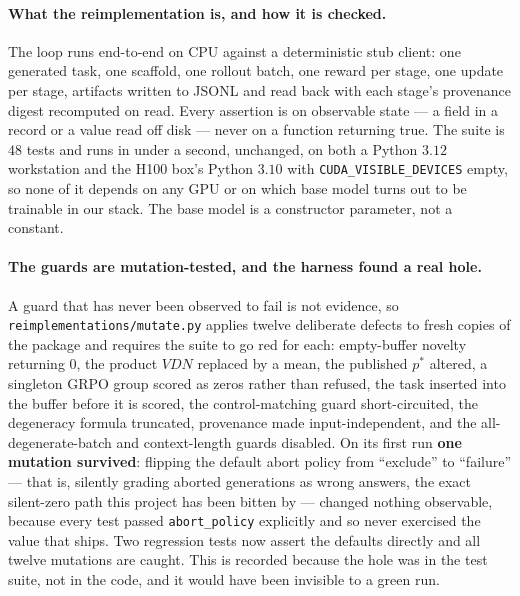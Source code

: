 \paragraph{What the reimplementation is, and how it is checked.} The loop runs end-to-end
on CPU against a deterministic stub client: one generated task, one scaffold, one rollout
batch, one reward per stage, one update per stage, artifacts written to JSONL and read
back with each stage's provenance digest recomputed on read. Every assertion is on
observable state --- a field in a record or a value read off disk --- never on a function
returning true. The suite is $48$ tests and runs in under a second, unchanged, on both a
Python $3.12$ workstation and the H100 box's Python $3.10$ with
\texttt{CUDA\_VISIBLE\_DEVICES} empty, so none of it depends on any GPU or on which base
model turns out to be trainable in our stack. The base model is a constructor parameter,
not a constant.

\paragraph{The guards are mutation-tested, and the harness found a real hole.} A guard
that has never been observed to fail is not evidence, so
\texttt{reimplementations/mutate.py} applies twelve deliberate defects to fresh copies of
the package and requires the suite to go red for each: empty-buffer novelty returning
$0$, the product $VDN$ replaced by a mean, the published $p^*$ altered, a singleton GRPO
group scored as zeros rather than refused, the task inserted into the buffer before it is
scored, the control-matching guard short-circuited, the degeneracy formula truncated,
provenance made input-independent, and the all-degenerate-batch and context-length guards
disabled. On its first run \textbf{one mutation survived}: flipping the default abort
policy from ``exclude'' to ``failure'' --- that is, silently grading aborted generations
as wrong answers, the exact silent-zero path this project has been bitten by --- changed
nothing observable, because every test passed \texttt{abort\_policy} explicitly and so
never exercised the value that ships. Two regression tests now assert the defaults
directly and all twelve mutations are caught. This is recorded because the hole was in
the test suite, not in the code, and it would have been invisible to a green run.

